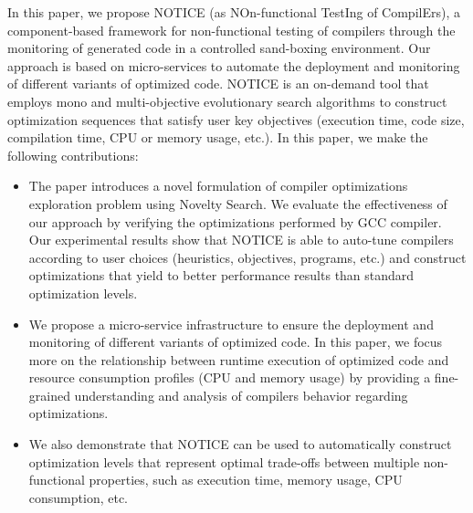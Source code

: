 In this paper, we propose NOTICE (as NOn-functional TestIng of CompilErs), a component-based framework for non-functional testing of compilers through the monitoring of generated code in a controlled sand-boxing environment. Our approach is based on micro-services to automate the deployment and monitoring of different variants of optimized code. NOTICE is an on-demand tool that employs mono and multi-objective evolutionary search algorithms to construct optimization sequences that satisfy user key objectives (execution time, code size, compilation time, CPU or memory usage, etc.).
In this paper, we make the following contributions:
\begin{itemize}  
	
	
	
	\item The paper introduces a novel formulation of compiler optimizations exploration problem using Novelty Search. We evaluate the effectiveness of our approach by verifying the optimizations performed by GCC compiler.
	Our experimental results show that NOTICE is able to auto-tune compilers according to user choices (heuristics, objectives, programs, etc.) and construct optimizations that yield to better performance results than standard optimization levels.
	
	\item We propose a micro-service infrastructure to ensure the deployment and monitoring of different variants of optimized code. In this paper, we focus more on the relationship between runtime execution of optimized code and resource consumption profiles (CPU and memory usage) by providing a fine-grained understanding and analysis of compilers behavior regarding optimizations.
	

	\item We also demonstrate that NOTICE can be used to automatically construct optimization levels that represent optimal trade-offs between multiple non-functional properties, such as execution time, memory usage, CPU consumption, etc.
\end{itemize}


 



